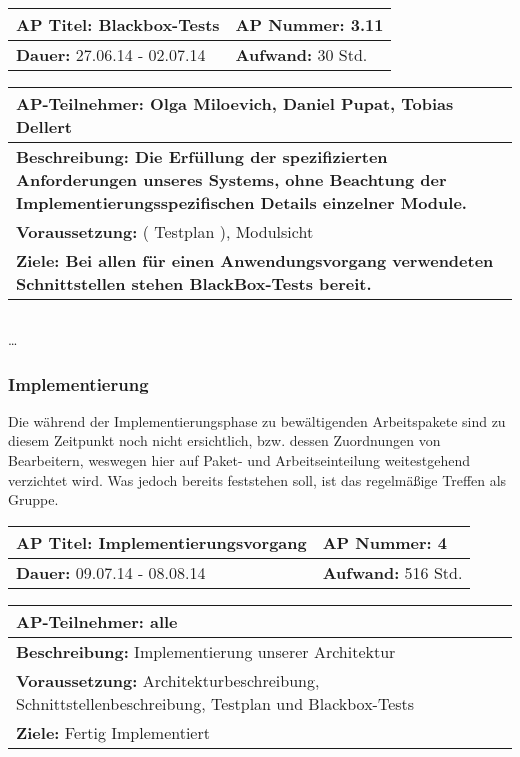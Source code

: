 \begin{tabular}{|p{7.43cm}|p{7.43cm}|}
\hline
\textbf{AP Titel: }Blackbox-Tests & \textbf{AP Nummer: }3.11\\ 
\hline
\textbf{Dauer: }27.06.14 - 02.07.14& \textbf{Aufwand: }30 Std.\\
\hline
\end{tabular}
\begin{tabular}{|p{15.3cm}|}
\hline
\textbf{AP-Teilnehmer: }Olga Miloevich, Daniel Pupat, Tobias Dellert\\
\hline
\textbf{Beschreibung: Die Erfüllung der spezifizierten Anforderungen unseres Systems, ohne
Beachtung der Implementierungsspezifischen Details einzelner Module.}\\
\hline
\textbf{Voraussetzung: }( Testplan ), Modulsicht\\
\hline 
\textbf{Ziele: Bei allen für einen Anwendungsvorgang verwendeten Schnittstellen stehen BlackBox-Tests bereit.}\\
\hline 
\end{tabular}
\begin{verbatim}

\end{verbatim}

\ldots

\subsubsection{Implementierung}

Die während der Implementierungsphase zu bewältigenden Arbeitspakete sind zu diesem Zeitpunkt noch nicht ersichtlich, bzw. dessen Zuordnungen von Bearbeitern, weswegen hier auf Paket- und Arbeitseinteilung weitestgehend verzichtet wird. Was jedoch bereits feststehen soll, ist das regelmäßige Treffen als Gruppe. 

\begin{tabular}{|p{7.43cm}|p{7.43cm}|}
\hline
\textbf{AP Titel: }Implementierungsvorgang & \textbf{AP Nummer: }4\\ 
\hline
\textbf{Dauer: }09.07.14 - 08.08.14& \textbf{Aufwand: } 516 Std.\\
\hline
\end{tabular}
\begin{tabular}{|p{15.3cm}|}
\hline
\textbf{AP-Teilnehmer: }alle\\
\hline
\textbf{Beschreibung: }Implementierung unserer Architektur\\
\hline
\textbf{Voraussetzung: }Architekturbeschreibung, Schnittstellenbeschreibung, Testplan und Blackbox-Tests \\
\hline 
\textbf{Ziele: }Fertig Implementiert\\
\hline 
\end{tabular}


